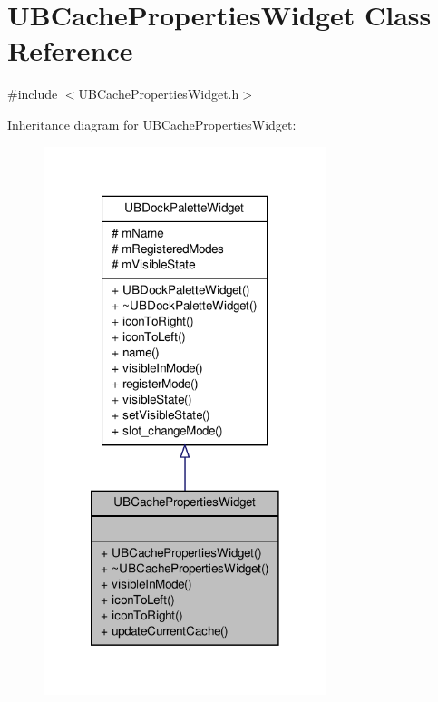 \hypertarget{class_u_b_cache_properties_widget}{\section{U\-B\-Cache\-Properties\-Widget Class Reference}
\label{d8/ddf/class_u_b_cache_properties_widget}
}


{\ttfamily \#include $<$U\-B\-Cache\-Properties\-Widget.\-h$>$}



Inheritance diagram for U\-B\-Cache\-Properties\-Widget\-:
\nopagebreak
\begin{figure}[H]
\begin{center}
\leavevmode
\includegraphics[width=234pt]{d8/d15/class_u_b_cache_properties_widget__inherit__graph}
\end{center}
\end{figure}


